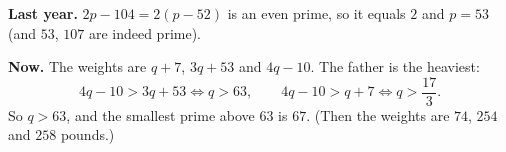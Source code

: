 \textbf{Last year.} $2p-104=2(p-52)$ is an even prime, so it equals $2$ and $p=53$ (and $53$, $107$ are indeed prime).

\textbf{Now.} The weights are $q+7$, $3q+53$ and $4q-10$. The father is the heaviest:
\[4q-10>3q+53\iff q>63,\qquad 4q-10>q+7\iff q>\dfrac{17}{3}.\]
So $q>63$, and the smallest prime above $63$ is $\boxed{67}$. (Then the weights are $74$, $254$ and $258$ pounds.)
